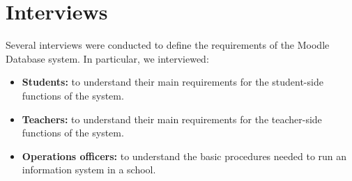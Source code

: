 \section{Interviews}
Several interviews were conducted to define the requirements of the Moodle Database system.
In particular, we interviewed:
\begin{itemize}
    \item \textbf{Students:} to understand their main requirements for the student-side functions of the system.
    \item \textbf{Teachers:} to understand their main requirements for the teacher-side functions of the system.
    \item \textbf{Operations officers:} to understand the basic procedures needed to run an information system in a school.
\end{itemize}
